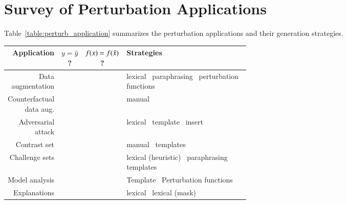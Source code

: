 \section{Survey of Perturbation Applications}
\label{appendix:paper_survey}


Table~\ref{table:perturb_application} summarizes the perturbation applications and their generation strategies.

\begin{table*}
\small
\centering
\begin{tabular}{r c c p{0.55\linewidth}}
\toprule
\textbf{Application} & \textbf{$y = \hat{y}$}? & $f(x) = f(\hat{x})$? & \textbf{Strategies} \\ 
\midrule
Data augmentation & \cmark & \qmark & 
    lexical~\cite{Wu2019ConditionalBC, Wei2019EDAED, Kumar2020DataAU}\newline
    paraphrasing~\cite{iyyer2018adversarial} \newline
    perturbation functions~\cite{ratner2017snorkel}
\\\midrule
Counterfactual data aug. & \xmark & \qmark & 
    manual~\cite{kaushik2019learning} \newline
\\\midrule
Adversarial attack & \cmark & \xmark & 
    lexical~\cite{alzantot2018generating, garg2020bae, li-etal-2020-bert-attack, morris2020textattack, tan2020s, jin2020bert, ebrahimi2017hotflip, Zhang2019GeneratingFA, Jia2019CertifiedRT} \newline
    template~\cite{jiang2019avoiding}\newline
    insert~\cite{Song2020UniversalAA}
\\\midrule
Contrast set & \xmark & \qmark & 
    manual~\cite{li2020linguistically} \newline
    templates~\cite{li2020linguistically}
\\\midrule
Challenge sets & \qmark & \qmark & 
    lexical (heuristic)~\cite{kaushik2019learning, naik2018stress} \newline
    paraphrasing~\cite{Kavumba2019WhenCP} \newline
    templates~\cite{Geiger2019PosingFG, kaushik2019learning, nie2019analyzing, mccoy2019right}
\\\midrule
Model analysis & \qmark & \qmark & 
    Template~\cite{Goodwin2020ProbingLS}\newline
    Perturbation functions~\cite{wu2019errudite, bowman-etal-2015-large}
\\\midrule
Explanations & \qmark & \qmark & 
    lexical~\cite{hase2020evaluating, vig2020causal, kang2020counterfactual} \newline
    lexical (mask)~\cite{ramon2019counterfactual, ribeiro2018anchors, }
\\
\bottomrule
\end{tabular}

\caption{Paper survey on the perturbation applications.}
\label{table:perturb_application}
\end{table*}
